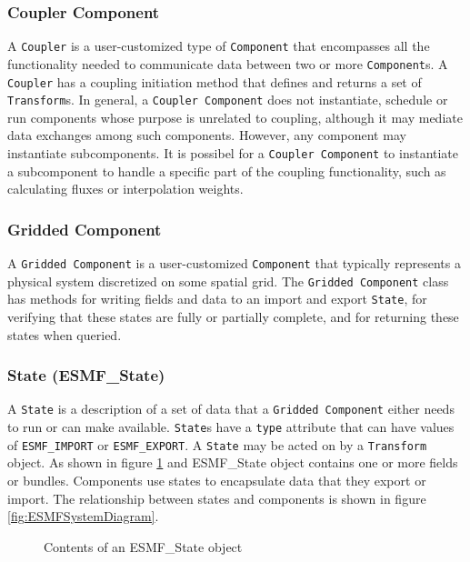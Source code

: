 \subsubsection{Coupler Component }
A {\tt Coupler} is a user-customized type of {\tt Component} that 
encompasses all the functionality needed to communicate data between two or 
more {\tt Component}s.  A {\tt Coupler} has a coupling initiation method that 
defines and returns a set of {\tt Transform}s. In general, a {\tt Coupler Component} does not instantiate, schedule or run components whose purpose is unrelated 
to coupling, although it may mediate data exchanges among such components.
However, any component may instantiate subcomponents. It is possibel
for a {\tt Coupler Component} to instantiate a subcomponent to handle a
specific part of the coupling functionality, such as calculating fluxes
or interpolation weights.


\subsubsection{Gridded Component }
\label{sec:griddedcomponent} 
A {\tt Gridded Component} is a user-customized {\tt Component} 
that typically represents a physical system discretized on some spatial grid.
The {\tt Gridded Component} class has methods for writing 
fields and data to an import and export {\tt State}, for verifying that
these states are fully or partially complete, and for returning these
states when queried.

\subsubsection{State (ESMF\_State)}
A {\tt State} is a description of a set of data that a 
{\tt Gridded Component} either needs to run or can make available.  
{\tt State}s
have a {\tt type} attribute that can have values of {\tt ESMF\_IMPORT} or
{\tt ESMF\_EXPORT}.  A {\tt State} may be acted on by a {\tt Transform} object.
As shown in figure \ref{fig:ESMFStateDiagram} and ESMF\_State object contains 
one or more fields or bundles. Components use states to encapsulate 
data that they export or import. The relationship between states and 
components is shown in figure \ref{fig:ESMFSystemDiagram}.

\begin{figure}
\caption[{ESMF State Contents}]{Contents of an ESMF\_State object}
\label{fig:ESMFStateDiagram}
\end{figure}

